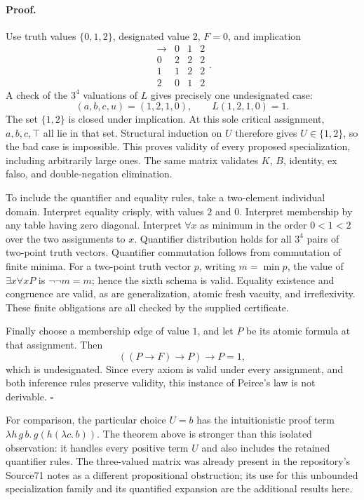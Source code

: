 \paragraph{Proof.}
Use truth values $\{0,1,2\}$, designated value $2$, $F=0$, and implication
\[
\begin{array}{c|ccc}
 \to&0&1&2\\\hline
 0&2&2&2\\
 1&1&2&2\\
 2&0&1&2
\end{array}.
\]
A check of the $3^4$ valuations of $L$ gives precisely one undesignated
case:
\[
 (a,b,c,u)=(1,2,1,0),\qquad L(1,2,1,0)=1.
\]
The set $\{1,2\}$ is closed under implication. At this sole critical
assignment, $a,b,c,\top$ all lie in that set. Structural induction on $U$
therefore gives $U\in\{1,2\}$, so the bad case is impossible. This proves
validity of every proposed specialization, including arbitrarily large ones.
The same matrix validates $K$, $B$, identity, ex falso, and double-negation
elimination.

To include the quantifier and equality rules, take a two-element individual
domain. Interpret equality crisply, with values $2$ and $0$. Interpret
membership by any table having zero diagonal. Interpret $\forall x$ as
minimum in the order $0<1<2$ over the two assignments to $x$.
Quantifier distribution holds for all $3^4$ pairs of two-point truth
vectors. Quantifier commutation follows from commutation of finite minima.
For a two-point truth vector $p$, writing $m=\min p$, the value of
$\exists x\forall x P$ is $\neg\neg m=m$; hence the sixth schema is
valid. Equality existence and congruence are valid, as are generalization,
atomic fresh vacuity, and irreflexivity. These finite obligations are all
checked by the supplied certificate.

Finally choose a membership edge of value $1$, and let $P$ be its atomic
formula at that assignment. Then
\[
 ((P\to F)\to P)\to P=1,
\]
which is undesignated. Since every axiom is valid under every assignment,
and both inference rules preserve validity, this instance of Peirce's law
is not derivable. $\square$

For comparison, the particular choice $U=b$ has the intuitionistic proof
term $\lambda h\,g\,b.\,g(h(\lambda c.\,b))$. The theorem above is stronger
than this isolated observation: it handles every positive term $U$ and
also includes the retained quantifier rules. The three-valued matrix was
already present in the repository's Source71 notes as a different
propositional obstruction; its use for this unbounded specialization family
and its quantified expansion are the additional results here.

